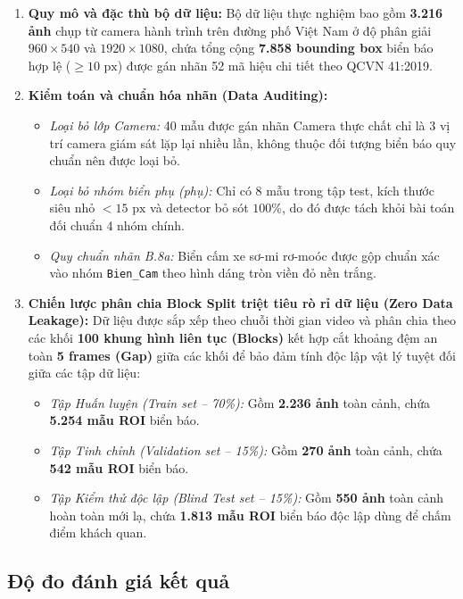 \documentclass[a4paper, 11pt]{article}
\begin{document}
\begin{enumerate}
    \item \textbf{Quy mô và đặc thù bộ dữ liệu:} Bộ dữ liệu thực nghiệm bao gồm \textbf{3.216 ảnh} chụp từ camera hành trình trên đường phố Việt Nam ở độ phân giải $960 \times 540$ và $1920 \times 1080$, chứa tổng cộng \textbf{7.858 bounding box} biển báo hợp lệ ($\ge 10\text{ px}$) được gán nhãn 52 mã hiệu chi tiết theo QCVN 41:2019.

    \item \textbf{Kiểm toán và chuẩn hóa nhãn (Data Auditing):}
    \begin{itemize}
        \item \textit{Loại bỏ lớp Camera:} 40 mẫu được gán nhãn Camera thực chất chỉ là 3 vị trí camera giám sát lặp lại nhiều lần, không thuộc đối tượng biển báo quy chuẩn nên được loại bỏ.
        \item \textit{Loại bỏ nhóm biển phụ (phụ):} Chỉ có 8 mẫu trong tập test, kích thước siêu nhỏ $< 15\text{ px}$ và detector bỏ sót $100\%$, do đó được tách khỏi bài toán đối chuẩn 4 nhóm chính.
        \item \textit{Quy chuẩn nhãn B.8a:} Biển cấm xe sơ-mi rơ-moóc được gộp chuẩn xác vào nhóm \texttt{Bien\_Cam} theo hình dáng tròn viền đỏ nền trắng.
    \end{itemize}

    \item \textbf{Chiến lược phân chia Block Split triệt tiêu rò rỉ dữ liệu (Zero Data Leakage):}
    Dữ liệu được sắp xếp theo chuỗi thời gian video và phân chia theo các khối \textbf{100 khung hình liên tục (Blocks)} kết hợp cắt khoảng đệm an toàn \textbf{5 frames (Gap)} giữa các khối để bảo đảm tính độc lập vật lý tuyệt đối giữa các tập dữ liệu:
    \begin{itemize}
        \item \textit{Tập Huấn luyện (Train set -- 70\%):} Gồm \textbf{2.236 ảnh} toàn cảnh, chứa \textbf{5.254 mẫu ROI} biển báo.
        \item \textit{Tập Tinh chỉnh (Validation set -- 15\%):} Gồm \textbf{270 ảnh} toàn cảnh, chứa \textbf{542 mẫu ROI} biển báo.
        \item \textit{Tập Kiểm thử độc lập (Blind Test set -- 15\%):} Gồm \textbf{550 ảnh} toàn cảnh hoàn toàn mới lạ, chứa \textbf{1.813 mẫu ROI} biển báo độc lập dùng để chấm điểm khách quan.
    \end{itemize}
\end{enumerate}

\subsection{Độ đo đánh giá kết quả}
\label{subsec:do_do_danh_gia}
\end{document}
